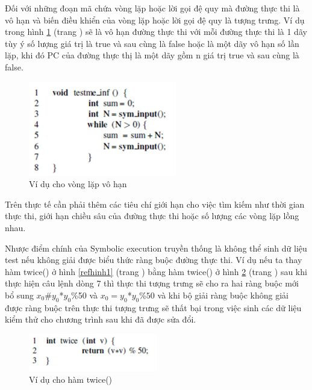 \documentclass[12pt,a4paper]{article}
\begin{document}
\indent Đối với những đoạn mã chứa vòng lặp hoặc lời gọi đệ quy mà đường thực thi là vô hạn và biến điều khiển của vòng lặp hoặc lời gọi đệ quy là tượng trưng. Ví dụ trong hình \ref{refhinh3} (trang \pageref{refhinh3}) sẽ là vô hạn đường thực thi với mỗi đường thực thi là 1 dãy tùy ý số lượng giá trị là true và sau cùng là false hoặc là một dãy vô hạn số lần lặp, khi đó PC của đường thực thị là một dãy gồm n giá trị true và sau cùng là false.

\begin{figure}[ht]
\begin{center}
\includegraphics{hinhanh/hinh3}
\end{center}
\caption{Ví dụ cho vòng lặp vô hạn}
\label{refhinh3}
\end{figure}

\indent Trên thực tế cần phải thêm các tiêu chí giới hạn cho việc tìm kiếm như thời gian thực thi, giới hạn chiều sâu của đường thực thi hoặc số lượng các vòng lặp lồng nhau.

\indent Nhược điểm chính của Symbolic execution truyền thống là không thể sinh dữ liệu test nếu không giải được biểu thức ràng buộc đường thực thi. Ví dụ nếu ta thay hàm twice() ở hình \ref{refhinh1} (trang \pageref{refhinh1}) bằng hàm twice() ở hình \ref{refhinh4} (trang \pageref{refhinh4}) sau khi thực hiện câu lệnh dòng 7 thì thực thi tượng trưng sẽ cho ra hai ràng buộc mới bổ sung $x_0$\#$y_0$*$y_0$\%50 và $x_0=y_0$*$y_0$\%$50$ và khi bộ giải ràng buộc không giải được ràng buộc trên thực thi tượng trưng sẽ thất bại trong việc sinh các dữ liệu kiểm thử cho chương trình sau khi đã được sửa đổi.

\begin{figure}[ht]
\begin{center}
\includegraphics{hinhanh/hinh4}
\end{center}
\caption{Ví dụ cho hàm twice()}
\label{refhinh4}
\end{figure}
\end{document}
